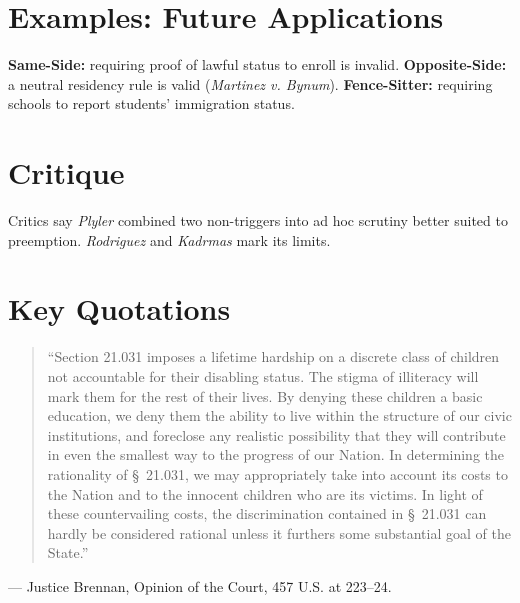 \documentclass[12pt]{article}
\begin{document}
\section{Examples: Future Applications}
\textbf{Same-Side:} requiring proof of lawful status to enroll is invalid. \textbf{Opposite-Side:} a neutral residency rule is valid (\textit{Martinez v. Bynum}). \textbf{Fence-Sitter:} requiring schools to report students' immigration status.

\section{Critique}
Critics say \textit{Plyler} combined two non-triggers into ad hoc scrutiny better suited to preemption. \textit{Rodriguez} and \textit{Kadrmas} mark its limits.

\section{Key Quotations}
\begin{quote}
``Section 21.031 imposes a lifetime hardship on a discrete class of children not accountable for their disabling status. The stigma of illiteracy will mark them for the rest of their lives. By denying these children a basic education, we deny them the ability to live within the structure of our civic institutions, and foreclose any realistic possibility that they will contribute in even the smallest way to the progress of our Nation. In determining the rationality of \S~21.031, we may appropriately take into account its costs to the Nation and to the innocent children who are its victims. In light of these countervailing costs, the discrimination contained in \S~21.031 can hardly be considered rational unless it furthers some substantial goal of the State.''
\end{quote}
\noindent --- Justice Brennan, Opinion of the Court, 457 U.S. at 223--24.
\end{document}
